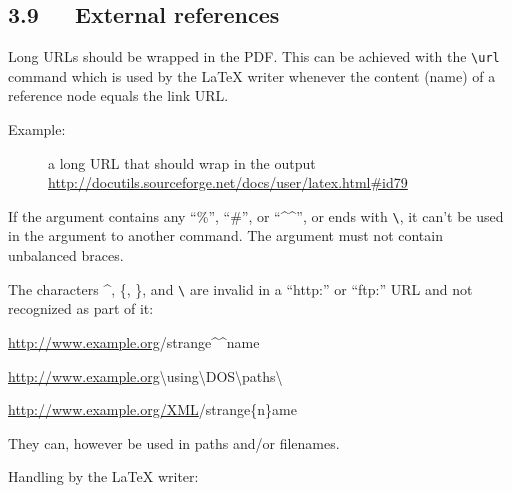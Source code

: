 \documentclass[a4paper]{article}
\newenvironment{DUlineblock}[1]{%
    \list{}{\setlength{\partopsep}{\parskip}
            \addtolength{\partopsep}{\baselineskip}
            \setlength{\topsep}{0pt}
            \setlength{\itemsep}{0.15\baselineskip}
            \setlength{\parsep}{0pt}
            \setlength{\leftmargin}{#1}}
    \raggedright
  }
  {\endlist}
\begin{document}
\subsection{3.9   External references%
  \label{external-references}%
}

Long URLs should be wrapped in the PDF. This can be achieved with the
\texttt{\textbackslash{}url} command which is used by the LaTeX writer whenever the content
(name) of a reference node equals the link URL.

\begin{description}
\item[{Example:}] \leavevmode 
a long URL that should wrap in the output
\url{http://docutils.sourceforge.net/docs/user/latex.html\#id79}

\end{description}

If the argument contains any “\%”, “\#”, or “\textasciicircum{}\textasciicircum{}”, or ends with \texttt{\textbackslash{}}, it can’t
be used in the argument to another command. The argument must not contain
unbalanced braces.

The characters \textasciicircum{}, \{, \}, and \texttt{\textbackslash{}} are invalid in a “http:” or “ftp:” URL
and not recognized as part of it:

\begin{DUlineblock}{0em}
\item[] \url{http://www.example.org}/strange\textasciicircum{}\textasciicircum{}name
\item[] \url{http://www.example.org}\textbackslash{}using\textbackslash{}DOS\textbackslash{}paths\textbackslash{}
\item[] \url{http://www.example.org/XML}/strange\{n\}ame
\end{DUlineblock}

They can, however be used in paths and/or filenames.

Handling by the LaTeX writer:
\end{document}
